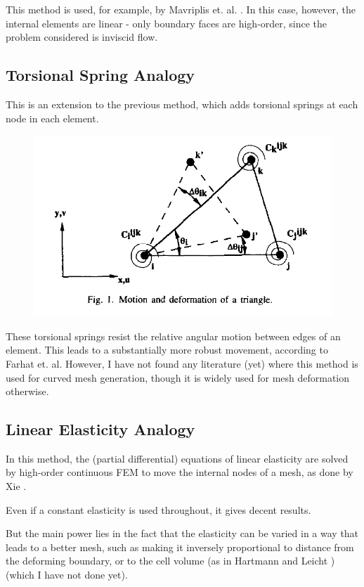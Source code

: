 \documentclass{article}
\begin{document}
This method is used, for example, by Mavriplis et. al. \cite{mavriplis}. In this case, however, the internal elements are linear - only boundary faces are high-order, since the problem considered is inviscid flow.
 

\subsection{Torsional Spring Analogy}
This is an extension to the previous method, which adds torsional springs at each node in each element. 

\begin{figure}
\includegraphics[scale=0.25]{torsionspring}
\end{figure}

These torsional springs resist the relative angular motion between edges of an element. This leads to a substantially more robust movement, according to Farhat et. al. \cite{farhat} However, I have not found any literature (yet) where this method is used for curved mesh generation, though it is widely used for mesh deformation otherwise.
 

\subsection{Linear Elasticity Analogy}
In this method, the (partial differential) equations of linear elasticity are solved by high-order continuous FEM to move the internal nodes of a mesh, as done by Xie \cite{xie}.

Even if a constant elasticity is used throughout, it gives decent results. 

But the main power lies in the fact that the elasticity can be varied in a way that leads to a better mesh, such as making it inversely proportional to distance from the deforming boundary, or to the cell volume (as in Hartmann and Leicht \cite{hartmann}) (which I have not done yet).
\end{document}
